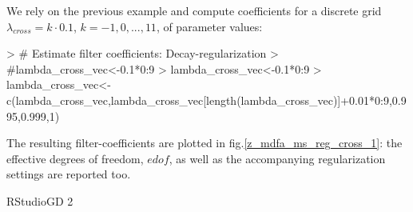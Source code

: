 \documentclass[a4paper]{book}
\begin{document}
We rely on the previous example and compute coefficients for a discrete grid $\lambda_{cross}=k\cdot 0.1$, $k=-1,0,...,11$, of parameter values:  
\begin{Schunk}
\begin{Sinput}
> # Estimate filter coefficients: Decay-regularization
> #lambda_cross_vec<-0.1*0:9
> lambda_cross_vec<-0.1*0:9
> lambda_cross_vec<-c(lambda_cross_vec,lambda_cross_vec[length(lambda_cross_vec)]+0.01*0:9,0.995,0.999,1)
\end{Sinput}
\end{Schunk}
The resulting filter-coefficients  are plotted in fig.\ref{z_mdfa_ms_reg_cross_1}: the effective degrees of freedom, $edof$, as well as the accompanying regularization settings are reported too.
\begin{Schunk}
\begin{Soutput}
RStudioGD 
        2 
\end{Soutput}
\end{Schunk}
\end{document}
